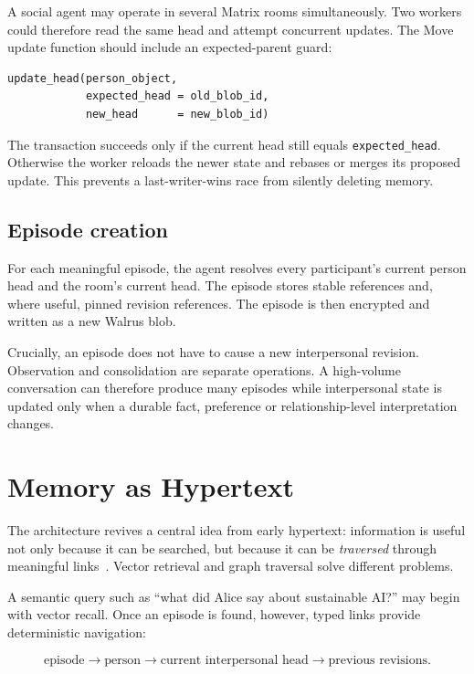 \documentclass[11pt]{article}
\begin{document}
A social agent may operate in several Matrix rooms simultaneously. Two workers could therefore read the same head and attempt concurrent updates. The Move update function should include an expected-parent guard:

\begin{lstlisting}
update_head(person_object,
            expected_head = old_blob_id,
            new_head      = new_blob_id)
\end{lstlisting}

The transaction succeeds only if the current head still equals \texttt{expected\_head}. Otherwise the worker reloads the newer state and rebases or merges its proposed update. This prevents a last-writer-wins race from silently deleting memory.

\subsection{Episode creation}

For each meaningful episode, the agent resolves every participant's current person head and the room's current head. The episode stores stable references and, where useful, pinned revision references. The episode is then encrypted and written as a new Walrus blob.

Crucially, an episode does not have to cause a new interpersonal revision. Observation and consolidation are separate operations. A high-volume conversation can therefore produce many episodes while interpersonal state is updated only when a durable fact, preference or relationship-level interpretation changes.

\section{Memory as Hypertext}

The architecture revives a central idea from early hypertext: information is useful not only because it can be searched, but because it can be \emph{traversed} through meaningful links~\cite{bush,nelson}. Vector retrieval and graph traversal solve different problems.

A semantic query such as ``what did Alice say about sustainable AI?'' may begin with vector recall. Once an episode is found, however, typed links provide deterministic navigation:

\[
\text{episode}
\rightarrow \text{person}
\rightarrow \text{current interpersonal head}
\rightarrow \text{previous revisions}.
\]
\end{document}
